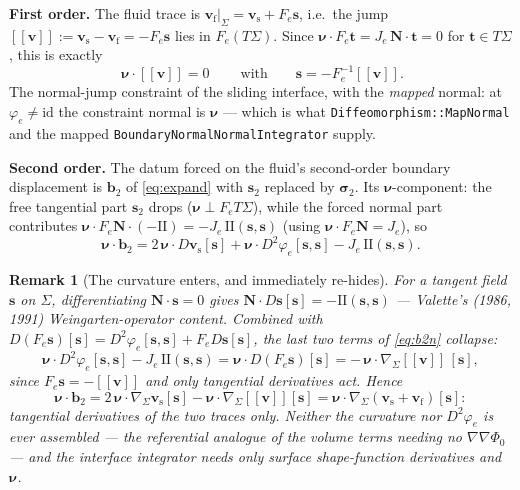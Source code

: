 \documentclass[11pt]{article}
\newtheorem{remark}{Remark}
\newcommand{\bnu}{\bm{\nu}}
\newcommand{\bN}{\mathbf{N}}
\newcommand{\bs}{\mathbf{s}}
\newcommand{\bv}{\mathbf{v}}
\newcommand{\jump}[1]{[\![#1]\!]}
\begin{document}
\textbf{First order.} The fluid trace is
$\bv_{\mathrm{f}}|_\Sigma = \bv_{\mathrm{s}} + F_e\bs$, i.e.\ the jump
$\jump{\bv} := \bv_{\mathrm{s}} - \bv_{\mathrm{f}} = -F_e\bs$ lies in
$F_e(T\Sigma)$. Since $\bnu\cdot F_e\mathbf{t} = J_e\,\bN\cdot\mathbf{t}
= 0$ for $\mathbf{t}\in T\Sigma$, this is exactly
\begin{equation}
  \boxed{\ \bnu\cdot\jump{\bv} = 0 \ }
  \qquad\text{with}\qquad
  \bs = -F_e^{-1}\jump{\bv} .
  \label{eq:constraint}
\end{equation}
The normal-jump constraint of the sliding interface, with the
\emph{mapped} normal: at $\varphi_e \neq \mathrm{id}$ the constraint
normal is $\bnu$ --- which is what \texttt{Diffeomorphism::MapNormal}
and the mapped \texttt{BoundaryNormalNormalIntegrator} supply.

\textbf{Second order.} The datum forced on the fluid's second-order
boundary displacement is $\mathbf{b}_2$ of \eqref{eq:expand} with
$\bs_2$ replaced by $\bm{\sigma}_2$. Its $\bnu$-component: the free
tangential part $\bs_2$ drops ($\bnu \perp F_e T\Sigma$), while the
forced normal part contributes $\bnu\cdot F_e\bN\cdot(-\mathrm{II}) =
-J_e\,\mathrm{II}(\bs,\bs)$ (using $\bnu\cdot F_e\bN = J_e$), so
\begin{equation}
  \bnu\cdot\mathbf{b}_2
  = 2\,\bnu\cdot D\bv_{\mathrm{s}}[\bs]
  + \bnu\cdot D^2\varphi_e[\bs,\bs]
  - J_e\,\mathrm{II}(\bs,\bs).
  \label{eq:b2n}
\end{equation}

\begin{remark}[The curvature enters, and immediately re-hides]
\label{rem:wein}
For a tangent field $\bs$ on $\Sigma$, differentiating
$\bN\cdot\bs = 0$ gives $\bN\cdot D\bs[\bs] = -\mathrm{II}(\bs,\bs)$
--- Valette's (1986, 1991) Weingarten-operator content. Combined with
$D(F_e\bs)[\bs] = D^2\varphi_e[\bs,\bs] + F_e D\bs[\bs]$, the last two
terms of \eqref{eq:b2n} collapse:
\begin{equation}
  \bnu\cdot D^2\varphi_e[\bs,\bs] - J_e\,\mathrm{II}(\bs,\bs)
  = \bnu\cdot D(F_e\bs)[\bs]
  = -\,\bnu\cdot \nabla_\Sigma\jump{\bv}\,[\bs],
  \label{eq:collapse}
\end{equation}
since $F_e\bs = -\jump{\bv}$ and only tangential derivatives act.
Hence
\begin{equation}
  \bnu\cdot\mathbf{b}_2
  = 2\,\bnu\cdot \nabla_\Sigma\bv_{\mathrm{s}}[\bs]
  - \bnu\cdot \nabla_\Sigma\jump{\bv}[\bs]
  = \bnu\cdot \nabla_\Sigma(\bv_{\mathrm{s}} + \bv_{\mathrm{f}})[\bs]:
  \label{eq:b2clean}
\end{equation}
tangential derivatives of the two \emph{traces} only. Neither the
curvature nor $D^2\varphi_e$ is ever assembled --- the referential
analogue of the volume terms needing no $\nabla\nabla\Phi_0$ --- and
the interface integrator needs only surface shape-function derivatives
and $\bnu$.
\end{remark}
\end{document}
